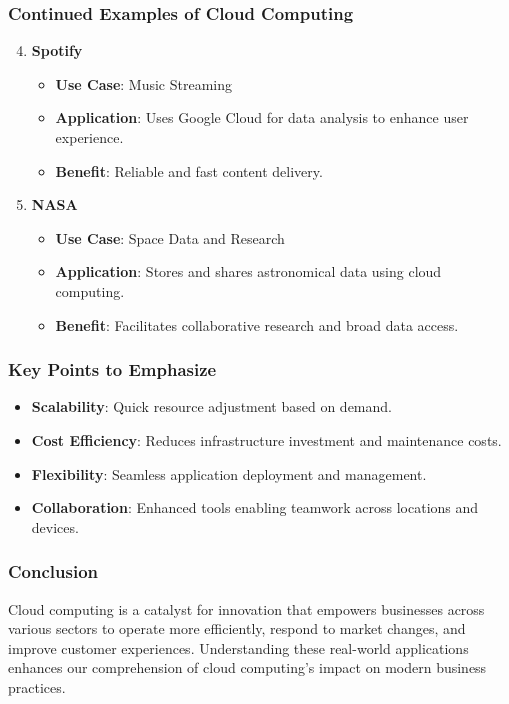 \documentclass[aspectratio=169]{beamer}
\begin{document}
\begin{frame}[fragile]
    \frametitle{Continued Examples of Cloud Computing}
    \begin{enumerate}
        \setcounter{enumi}{3}
        \item \textbf{Spotify}
        \begin{itemize}
            \item \textbf{Use Case}: Music Streaming
            \item \textbf{Application}: Uses Google Cloud for data analysis to enhance user experience.
            \item \textbf{Benefit}: Reliable and fast content delivery.
        \end{itemize}
        
        \item \textbf{NASA}
        \begin{itemize}
            \item \textbf{Use Case}: Space Data and Research
            \item \textbf{Application}: Stores and shares astronomical data using cloud computing.
            \item \textbf{Benefit}: Facilitates collaborative research and broad data access.
        \end{itemize}
    \end{enumerate}
\end{frame}

\begin{frame}[fragile]
    \frametitle{Key Points to Emphasize}
    \begin{itemize}
        \item \textbf{Scalability}: Quick resource adjustment based on demand.
        \item \textbf{Cost Efficiency}: Reduces infrastructure investment and maintenance costs.
        \item \textbf{Flexibility}: Seamless application deployment and management.
        \item \textbf{Collaboration}: Enhanced tools enabling teamwork across locations and devices.
    \end{itemize}
\end{frame}

\begin{frame}[fragile]
    \frametitle{Conclusion}
    Cloud computing is a catalyst for innovation that empowers businesses across various sectors to operate more efficiently, respond to market changes, and improve customer experiences. 
    Understanding these real-world applications enhances our comprehension of cloud computing's impact on modern business practices.
\end{frame}
\end{document}

